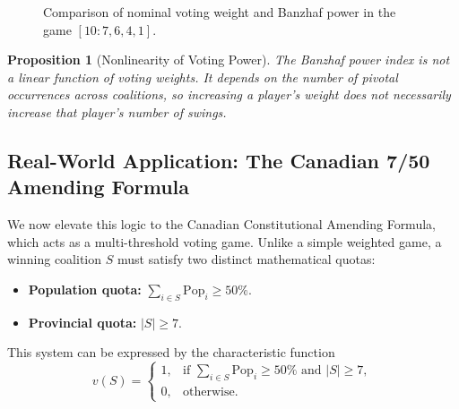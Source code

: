 \documentclass[lettersize,journal]{IEEEtran}
\newtheorem{proposition}{Proposition}
\begin{document}
\begin{figure}[!t]
\centering
{}
\caption{Comparison of nominal voting weight and Banzhaf power in the game $[10:7,6,4,1]$.}
\label{fig:paradox}
\end{figure}

\begin{proposition}[Nonlinearity of Voting Power]
The Banzhaf power index is not a linear function of voting weights. It depends on the number of pivotal occurrences across coalitions, so increasing a player's weight does not necessarily increase that player's number of swings.
\end{proposition}

\subsection{Real-World Application: The Canadian 7/50 Amending Formula}
We now elevate this logic to the Canadian Constitutional Amending Formula, which acts as a multi-threshold voting game. Unlike a simple weighted game, a winning coalition $S$ must satisfy two distinct mathematical quotas:
\begin{itemize}
    \item \textbf{Population quota:} $\sum_{i\in S} \mathrm{Pop}_i \ge 50\%$.
    \item \textbf{Provincial quota:} $|S|\ge 7$.
\end{itemize}

This system can be expressed by the characteristic function
\begin{equation}
v(S)=
\begin{cases}
1, & \text{if } \sum_{i\in S} \mathrm{Pop}_i \ge 50\% \text{ and } |S|\ge 7,\\
0, & \text{otherwise.}
\end{cases}
\end{equation}
\end{document}
